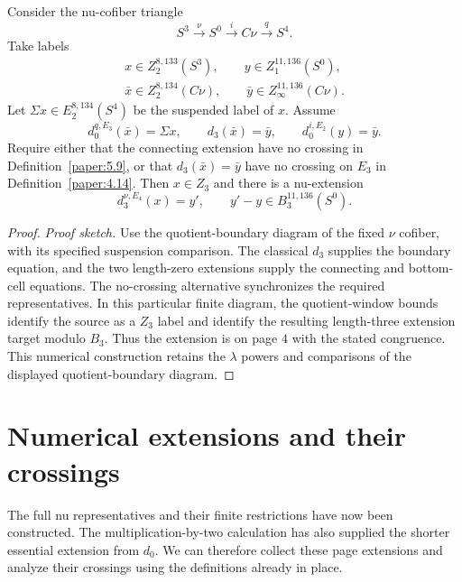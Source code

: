 \begin{theorem}
\label{sem:ProofTools:nu-zero-layer}
Consider the nu-cofiber triangle
\[
S^3\xrightarrow{\nu}S^0\xrightarrow{i}C\nu\xrightarrow{q}S^4.
\]
Take labels
\[
\begin{gathered}
x\in Z_2^{8,133}(S^3),\qquad y\in Z_1^{11,136}(S^0),\\
\bar x\in Z_2^{8,134}(C\nu),\qquad
\bar y\in Z_\infty^{11,136}(C\nu).
\end{gathered}
\]
Let $\Sigma x\in E_2^{8,134}(S^4)$ be the suspended label of $x$.
Assume
\[
d_0^{q,E_3}(\bar x)=\Sigma x,\qquad
 d_3(\bar x)=\bar y,\qquad d_0^{i,E_2}(y)=\bar y.
\]
Require either that the connecting extension have no crossing in
Definition~\ref{paper:5.9}, or that $d_3(\bar x)=\bar y$ have no
crossing on $E_3$ in Definition~\ref{paper:4.14}.
Then $x\in Z_3$ and there is a nu-extension
\[
d_3^{\nu,E_4}(x)=y',\qquad y'-y\in B_3^{11,136}(S^0).
\]
\end{theorem}
\begin{proof}
\textit{Proof sketch.}
Use the quotient-boundary diagram of the fixed $\nu$ cofiber, with its specified suspension comparison. The classical $d_3$ supplies the boundary equation, and the two length-zero extensions supply the connecting and bottom-cell equations. The no-crossing alternative synchronizes the required representatives. In this particular finite diagram, the quotient-window bounds identify the source as a $Z_3$ label and identify the resulting length-three extension target modulo $B_3$. Thus the extension is on page $4$ with the stated congruence. This numerical construction retains the $\lambda$ powers and
comparisons of the displayed quotient-boundary diagram.
\end{proof}

\section{Numerical extensions and their crossings}

The full nu representatives and their finite restrictions have now been
constructed. The multiplication-by-two calculation has also supplied
the shorter essential extension from $d_0$. We can therefore collect
these page extensions and analyze their crossings using the definitions
already in place.

